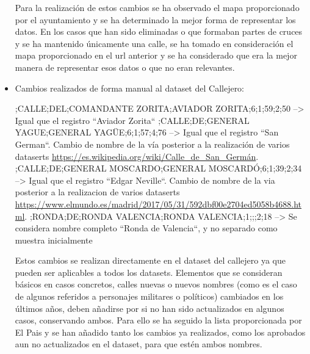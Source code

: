 \begin{itemize}
Para la realización de estos cambios se ha observado el mapa proporcionado por el ayuntamiento \cite{mapa_callejero_klm} y se ha determinado la mejor forma de representar los datos. En los casos que han sido eliminadas o que formaban partes de cruces y se ha mantenido únicamente una calle, se ha tomado en consideración el mapa proporcionado en el url anterior y se ha considerado que era la mejor manera de representar esos datos o que no eran relevantes.









    \item Cambios realizados de forma manual al dataset del Callejero:
\begin{tiny}
;CALLE;DEL;COMANDANTE ZORITA;AVIADOR ZORITA;6;1;59;2;50 --> Igual que el registro ``Aviador Zorita``
;CALLE;DE;GENERAL YAGUE;GENERAL YAGÜE;6;1;57;4;76 --> Igual que el registro ``San German``. Cambio de nombre de la vía posterior a la realización de varios dataserts \url{https://es.wikipedia.org/wiki/Calle_de_San_Germán}.
;CALLE;DE;GENERAL MOSCARDO;GENERAL MOSCARDÓ;6;1;39;2;34 --> Igual que el registro ``Edgar Neville``. Cambio de nombre de la via posterior a la realizacion de varios dataserts \url{https://www.elmundo.es/madrid/2017/05/31/592dbf00e2704ed5058b4688.html}.
;RONDA;DE;RONDA VALENCIA;RONDA VALENCIA;1;;;2;18 --> Se considera nombre completo ``Ronda de Valencia``, y no separado como muestra inicialmente
\end{tiny}

Estos cambios se realizan directamente en el dataset del callejero ya que pueden ser aplicables a todos los datasets. Elementos que se consideran básicos en casos concretos, calles nuevas o nuevos nombres (como es el caso de algunos referidos a personajes militares o políticos) cambiados en los últimos años, deben añadirse por si no han sido actualizados en algunos casos, conservando ambos.\newline
Para ello se ha seguido la lista proporcionada por El Pais \cite{calles_cambioNombre_elPais} y se han añadido tanto los cambios ya realizados, como los aprobados aun no actualizados en el dataset, para que estén ambos nombres.


\end{itemize}

